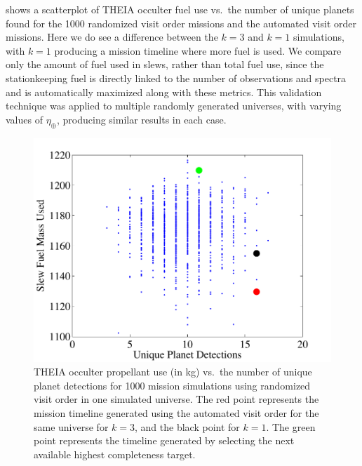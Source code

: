  shows a scatterplot of THEIA occulter fuel use vs.~the number of unique planets found for the 1000 randomized visit order missions and the automated visit order missions.  Here we do see a difference between the $k = 3$ and $k = 1$ simulations, with $k = 1$ producing a mission timeline where more fuel is used.  We compare only the amount of fuel used in slews, rather than total fuel use, since the stationkeeping fuel is directly linked to the number of observations and spectra and is automatically maximized along with these metrics.  This validation technique was applied to multiple randomly generated universes, with varying values of $\eta_\oplus$, producing similar results in each case.
\begin{figure}[ht]
\centering
\includegraphics[width = 5in]{./figures/optim_fuelvudets}
 \caption[THEIA occulter propellant use]{ \label{fig:optim_fuelvudets} THEIA occulter propellant use (in kg) vs.~the number of unique planet detections for 1000 mission simulations using randomized visit order in one simulated universe.  The red point represents the mission timeline generated using the automated visit order for the same universe for $k = 3$, and the black point for $k = 1$.  The green point represents the timeline generated by selecting the next available highest completeness target.}
 \end{figure}

